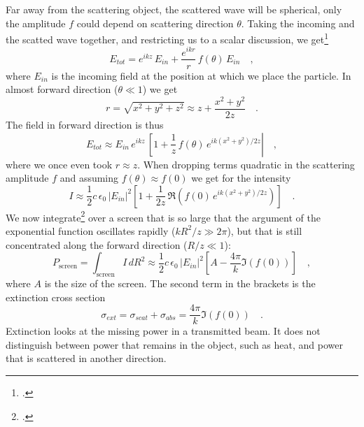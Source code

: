 Far away from the scattering object, the scattered wave will be spherical, only the amplitude $f$ could depend on scattering direction $\theta$. Taking the incoming and the scatted wave together, and restricting us to a scalar discussion, we get\footcite{Newton:1976cz}
\begin{equation}
 E_{tot} =  e^{i k z}  \, E_{in}  +  \frac{e^{i k r}}{r} \, f(\theta) \,  E_{in} \quad , 
\end{equation}
where $E_{in}$ is the incoming field at the position at which we place the particle.
In almost forward direction ($\theta \ll 1$) we get
\begin{equation}
r = \sqrt{x^2 + y^2 + z^2} \approx z + \frac{x^2 + y^2}{2z } \quad .
\end{equation}
The field in forward direction is thus
\begin{equation}
 E_{tot} \approx 
 E_{in} \, e^{i k z} \, 
 \left[1 + \frac{1}{z} \, f(\theta) \, e^{i k (x^2 + y^2)/2z } \right|  \quad ,
\end{equation}
where we once even took $r \approx z$. When dropping terms quadratic in the scattering amplitude $f$ and assuming $f(\theta) \approx f(0)$ we get for the  intensity
\begin{equation}
 I  \approx \frac{1}{2} c \, \epsilon_0 \,|E_{in}|^2 \left[ 1 +   \frac{1}{2 z} \, \Re  \left( f(0) \, e^{i k (x^2 + y^2)/2z } \right) \right] \quad .
\end{equation}
We now integrate\footcite{Newton:1976cz} over a screen that is so large that the argument of the exponential function oscillates rapidly ($k R^2 / z \gg 2 \pi$), but that is still concentrated along the forward direction ($R/z \ll 1$):
\begin{equation}
 P_\text{screen} = \int_\text{screen} I \, dR^2  \approx  \frac{1}{2} c \, \epsilon_0 \,|E_{in}|^2 \left[  A  - \frac{4 \pi }{k} \Im ( f(0) ) \right] \quad ,
\end{equation}
where $A$ is the size of the screen. The second term in the brackets is the extinction cross section
\begin{equation}
 \sigma_{ext} = \sigma_{scat}  + \sigma_{abs}  = \frac{4 \pi }{k} \Im ( f(0) ) \quad .
\end{equation}
Extinction looks at the missing power in a transmitted beam. It does not distinguish between power that remains in the object, such as heat, and power that is scattered in another direction.


